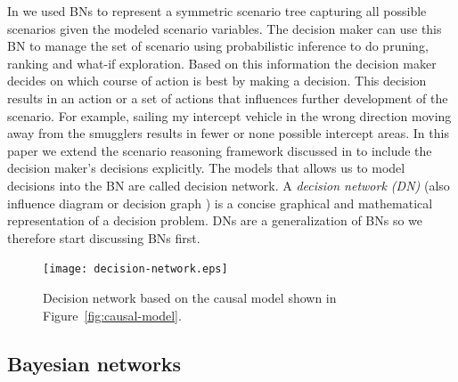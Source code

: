\documentclass[conference]{IEEEtran}
\begin{document}
In \cite{conrado14if} we used BNs to represent a symmetric scenario tree capturing all possible scenarios given the modeled scenario variables. The decision maker can use this BN to manage the set of scenario using probabilistic inference to do pruning, ranking and what-if exploration. Based on this information the decision maker decides on which course of action is best by making a decision. This decision results in an action or a set of actions that influences further development of the scenario. For example, sailing my intercept vehicle in the wrong direction moving away from the smugglers results in fewer or none possible intercept areas. In this paper we extend the scenario reasoning framework discussed in \cite{conrado14if} to include the decision maker's decisions explicitly. The models that allows us to model decisions into the BN are called decision network. A {\em decision network (DN)} (also influence diagram or decision graph \cite{russell02bn,howard84rpada,jensen07book}) is a concise graphical and mathematical representation of a decision problem. DNs are a generalization of BNs so we therefore start discussing BNs first.


\begin{figure}
\begin{center}
 \texttt{[image: decision-network.eps]}
 \caption{Decision network based on the causal model shown in Figure~\ref{fig:causal-model}.\label{fig:decision-graph}}
\end{center}
\end{figure}


\subsection{Bayesian networks}\label{sec:bayesian-networks}
\end{document}
